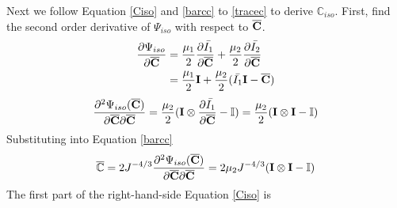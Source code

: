 Next we follow Equation \ref{Ciso} and \ref{barcc} to \ref{tracec} to derive $\mathbb{C}_{iso}$. First, find the second order derivative of $\Psi_{iso}$ with respect to $\overline{\bold{C}}$.
\begin{equation}
\begin{split}
\frac{\partial{\Psi_{iso}}}{\partial{\overline{\bold{C}}}} &= \frac{\mu_1}{2}\frac{\partial{\bar{I_1}}}{\partial{\overline{\bold{C}}}} +  \frac{\mu_2}{2}\frac{\partial{\bar{I_2}}}{\partial{\overline{\bold{C}}}} \\
&= \frac{\mu_1}{2}\bold{I} + \frac{\mu_2}{2}(\bar{I_1}\bold{I} - \overline{\bold{C}})
\end{split}
\end{equation}
\begin{equation}
\frac{\partial^2\Psi_{iso}(\overline{\bold{C}})}{\partial\overline{\bold{C}}\partial\overline{\bold{C}}} = 
\frac{\mu_2}{2}(\bold{I} \otimes \frac{\partial{\bar{I_1}}}{\partial{\overline{\bold{C}}}} - \mathbb{I}) = \frac{\mu_2}{2}(\bold{I} \otimes \bold{I} - \mathbb{I})
\end{equation}
Substituting into Equation \ref{barcc}
\begin{equation}
\overline{\mathbb{C}} = 2J^{-4/3}\frac{\partial^2\Psi_{iso}(\overline{\bold{C}})}{\partial{\overline{\bold{C}}}{\partial{\overline{\bold{C}}}}} = 2\mu_2{J^{-4/3}}(\bold{I} \otimes \bold{I} - \mathbb{I})
\end{equation}
The first part of the right-hand-side Equation \ref{Ciso} is
